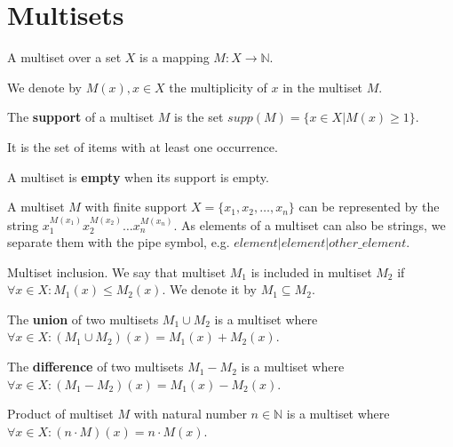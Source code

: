 
\section{Multisets} %
\label{sec:multisets}

\begin{definition}
A multiset over a set $X$ is a mapping $M: X\rightarrow \mathbb N$.
\end{definition}

We denote by $M(x), x\in X$ the multiplicity of $x$ in the multiset $M$.

\begin{definition}
The {\bf support} of a multiset $M$ is the set $supp(M)=\{x\in X|M(x)\geq 1\}$.
\end{definition}

It is the set of items with at least one occurrence.

\begin{definition}
A multiset is {\bf empty} when its support is empty.
\end{definition}

A multiset $M$ with finite support $X = \{x_1, x_2, \ldots, x_n\}$ can be represented by the string $x_1^{M(x_1)}x_2^{M(x_2)}\ldots x_n^{M(x_n)}$.
As elements of a multiset can also be strings, we separate them with the pipe symbol, e.g. $element|element|other\_element$.

\begin{definition}
Multiset inclusion. We say that multiset $M_1$ is included in multiset $M_2$ if $\forall x \in X: M_1(x)\leq M_2(x)$. We denote it by $M_1\subseteq M_2$.
\end{definition}

\begin{definition}
The {\bf union} of two multisets $M_1\cup M_2$ is a multiset where $\forall x \in X: (M_1\cup M_2)(x)=M_1(x)+M_2(x)$.
\end{definition}

\begin{definition}
The {\bf difference} of two multisets $M_1-M_2$ is a multiset where $\forall x \in X: (M_1-M_2)(x)=M_1(x)-M_2(x)$.
\end{definition}

\begin{definition}
Product of multiset $M$ with natural number $n\in \mathbb N$ is a multiset where $\forall x \in X: (n\cdot M)(x)=n\cdot M(x)$.  
\end{definition}


